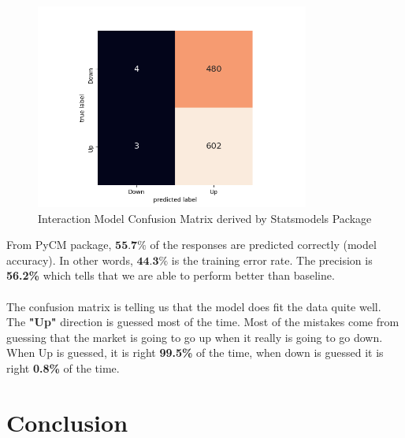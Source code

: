 \documentclass[12pt]{article}
\begin{document}
\begin{figure}[!htbp]
	\centering
	\includegraphics[width=9cm]{intmodel.png}
	\caption{Interaction Model Confusion Matrix derived by Statsmodels Package}
	\label{fig_5}
\end{figure}

From PyCM package, $\textbf{55.7\%}$ of the responses are predicted correctly (model accuracy). In other words, $\textbf{44.3\%}$ is the training error rate. The precision is \textbf{56.2\%} which tells that we are able to perform better than baseline.\\\\
The confusion matrix is telling us that the model does fit the data quite well. The \textbf{"Up"} direction is guessed most of the time. Most of the mistakes come from guessing that the market is going to go up when it really is going to go down. When Up is guessed, it is right \textbf{99.5\%} of the time, when down is guessed it is right \textbf{0.8\%} of the time.
















\section{Conclusion}
\end{document}
